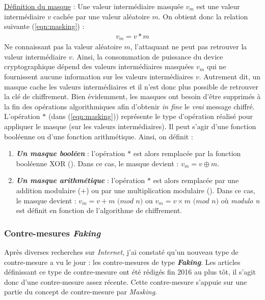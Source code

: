 \documentclass[10pt, oneside, a4paper]{article}
\begin{document}
\underline{Définition du masque} : Une valeur intermédiaire masquée $v_m$ est une valeur intermédiaire $v$ cachée par une valeur aléatoire $m$. On obtient donc la relation suivante (\ref{eqn:masking}) : 
\begin{gather}
	v_m = v * m\label{eqn:masking}
\end{gather}
Ne connaissant pas la valeur aléatoire $m$, l'attaquant ne peut pas retrouver la valeur intermédiaire $v$. Ainsi, la consommation de puissance du device cryptographique dépend des valeurs intermédiaires masquées $v_m$ qui ne fournissent aucune information sur les valeurs intermédiaires $v$. Autrement dit, un masque cache les valeurs intermédiaires et il n'est donc plus possible de retrouver la clé de chiffrement. Bien évidemment, les masques ont besoin d'être supprimés à la fin des opérations algorithmiques afin d'obtenir \textit{in fine} le \textit{vrai} message chiffré. \\
L'opération $*$ (dans (\ref{eqn:masking})) représente le type d'opération réalisé pour appliquer le masque (sur les valeurs intermédiaires). Il peut s'agir d'une fonction booléenne ou d'une fonction arithmétique. Ainsi, on définit : 
\begin{enumerate}
\item \textbf{\textit{Un masque booléen}} : l'opération $*$ est alors remplacée par la fonction booléenne XOR (\oplus). Dans ce cas, le masque devient : $v_m = v \oplus m$.
\item \textbf{\textit{Un masque arithmétique}} : l'opération $*$ est alors remplacée par une addition modulaire ($+$) ou par une multiplication modulaire (\times ). Dans ce cas, le masque devient : $v_m = v + m$ $(mod$ $n)$ ou $v_m = v \times m$ $(mod$ $n)$ où \textit{modulo n} est définit en fonction de l'algorithme de chiffrement.
\end{enumerate}

\newpage

\subsubsection{Contre-mesures \textit{Faking}}

Après diverses recherches sur \textit{Internet}, j'ai constaté qu'un nouveau type de contre-mesure a vu le jour : les contre-mesures de type \textbf{\textit{Faking}}. Les articles définissant ce type de contre-mesure ont été rédigés fin 2016 au plus tôt, il s'agit donc d'une contre-mesure assez récente. Cette contre-mesure s'appuie sur une partie du concept de contre-mesure par \textit{Masking}. 
\end{document}
